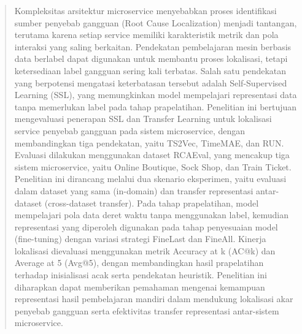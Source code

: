 \begin{abstract}
Kompleksitas arsitektur microservice menyebabkan proses identifikasi sumber penyebab gangguan (Root Cause Localization) menjadi tantangan, terutama karena setiap service memiliki karakteristik metrik dan pola interaksi yang saling berkaitan. Pendekatan pembelajaran mesin berbasis data berlabel dapat digunakan untuk membantu proses lokalisasi, tetapi ketersediaan label gangguan sering kali terbatas. Salah satu pendekatan yang berpotensi mengatasi keterbatasan tersebut adalah Self-Supervised Learning (SSL), yang memungkinkan model mempelajari representasi data tanpa memerlukan label pada tahap prapelatihan. Penelitian ini bertujuan mengevaluasi penerapan SSL dan Transfer Learning untuk lokalisasi service penyebab gangguan pada sistem microservice, dengan membandingkan tiga pendekatan, yaitu TS2Vec, TimeMAE, dan RUN. Evaluasi dilakukan menggunakan dataset RCAEval, yang mencakup tiga sistem microservice, yaitu Online Boutique, Sock Shop, dan Train Ticket. Penelitian ini dirancang melalui dua skenario eksperimen, yaitu evaluasi dalam dataset yang sama (in-domain) dan transfer representasi antar-dataset (cross-dataset transfer). Pada tahap prapelatihan, model mempelajari pola data deret waktu tanpa menggunakan label, kemudian representasi yang diperoleh digunakan pada tahap penyesuaian model (fine-tuning) dengan variasi strategi FineLast dan FineAll. Kinerja lokalisasi dievaluasi menggunakan metrik Accuracy at k (AC@k) dan Average at 5 (Avg@5), dengan membandingkan hasil prapelatihan terhadap inisialisasi acak serta pendekatan heuristik. Penelitian ini diharapkan dapat memberikan pemahaman mengenai kemampuan representasi hasil pembelajaran mandiri dalam mendukung lokalisasi akar penyebab gangguan serta efektivitas transfer representasi antar-sistem microservice.


\end{abstract}
